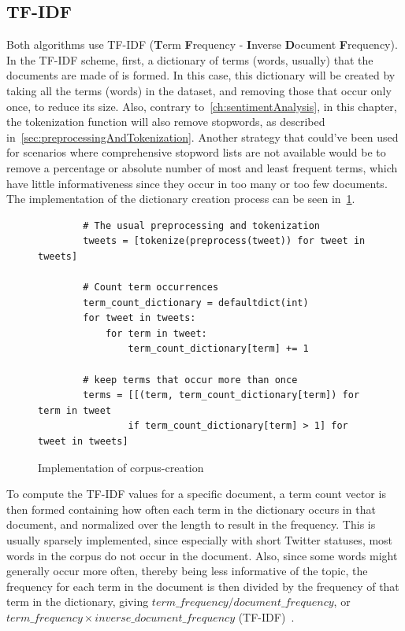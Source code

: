\subsection{TF-IDF}
\label{subsec:tfidf}

Both algorithms use TF-IDF (\textbf{T}erm \textbf{F}requency - \textbf{I}nverse \textbf{D}ocument \textbf{F}requency).
In the TF-IDF scheme, first, a dictionary of terms (words, usually) that the documents are made of is formed.
In this case, this dictionary will be created by taking all the terms (words) in the dataset,
and removing those that occur only once, to reduce its size.
Also, contrary to~\cref{ch:sentimentAnalysis}, in this chapter,
the tokenization function will also remove stopwords, as described in~\cref{sec:preprocessingAndTokenization}.
Another strategy that could've been used for scenarios where comprehensive stopword lists are not available
would be to remove a percentage or absolute number of most and least frequent terms,
which have little informativeness since they occur in too many or too few documents.
The implementation of the dictionary creation process can be seen in~\cref{code:create_corpus}.

\begin{figure}
    \caption{Implementation of corpus-creation}
    \label{code:create_corpus}
    \begin{verbatim}
        # The usual preprocessing and tokenization
        tweets = [tokenize(preprocess(tweet)) for tweet in tweets]

        # Count term occurrences
        term_count_dictionary = defaultdict(int)
        for tweet in tweets:
            for term in tweet:
                term_count_dictionary[term] += 1

        # keep terms that occur more than once
        terms = [[(term, term_count_dictionary[term]) for term in tweet
                if term_count_dictionary[term] > 1] for tweet in tweets]
    \end{verbatim}
\end{figure}

To compute the TF-IDF values for a specific document,
a term count vector is then formed containing how often each term in the dictionary occurs in that document,
and normalized over the length to result in the frequency.
This is usually sparsely implemented, since especially with short Twitter statuses,
most words in the corpus do not occur in the document.
Also, since some words might generally occur more often, thereby being less informative of the topic,
the frequency for each term in the document is then divided by the frequency of that term in the dictionary,
giving $term\_frequency / document\_frequency$, or $term\_frequency \times inverse\_document\_frequency$ (TF-IDF)~\cite{Blei2003}.

